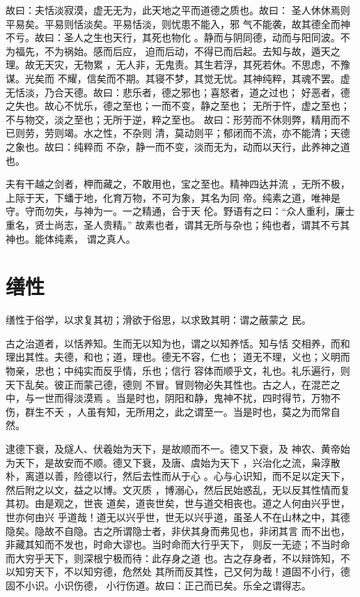 \documentclass[12pt,UTF8]{ctexbook}
\begin{document}
故曰：夫恬淡寂漠，虚无无为，此天地之平而道德之质也。故曰： 圣人休休焉则平易矣。平易则恬淡矣。平易恬淡，则忧患不能入，邪 气不能袭，故其德全而神不亏。故曰：圣人之生也天行，其死也物化 。静而与阴同德，动而与阳同波。不为福先，不为祸始。感而后应， 迫而后动，不得已而后起。去知与故，遁天之理。故无天灾，无物累 ，无人非，无鬼责。其生若浮，其死若休。不思虑，不豫谋。光矣而 不耀，信矣而不期。其寝不梦，其觉无忧。其神纯粹，其魂不罢。虚 无恬淡，乃合天德。故曰：悲乐者，德之邪也；喜怒者，道之过也； 好恶者，德之失也。故心不忧乐，德之至也；一而不变，静之至也； 无所于忤，虚之至也；不与物交，淡之至也；无所于逆，粹之至也。 故曰：形劳而不休则弊，精用而不已则劳，劳则竭。水之性，不杂则 清，莫动则平；郁闭而不流，亦不能清；天德之象也。故曰：纯粹而 不杂，静一而不变，淡而无为，动而以天行，此养神之道也。

夫有干越之剑者，柙而藏之，不敢用也，宝之至也。精神四达并流 ，无所不极，上际于天，下蟠于地，化育万物，不可为象，其名为同 帝。纯素之道，唯神是守。守而勿失，与神为一。一之精通，合于天 伦。野语有之曰：“众人重利，廉士重名，贤士尚志，圣人贵精。” 故素也者，谓其无所与杂也；纯也者，谓其不亏其神也。能体纯素， 谓之真人。
\section{缮性}

缮性于俗学，以求复其初；滑欲于俗思，以求致其明：谓之蔽蒙之 民。

古之治道者，以恬养知。生而无以知为也，谓之以知养恬。知与恬 交相养，而和理出其性。夫德，和也；道，理也。德无不容，仁也； 道无不理，义也；义明而物亲，忠也；中纯实而反乎情，乐也；信行 容体而顺乎文，礼也。礼乐遍行，则天下乱矣。彼正而蒙己德，德则 不冒。冒则物必失其性也。古之人，在混芒之中，与一世而得淡漠焉 。当是时也，阴阳和静，鬼神不扰，四时得节，万物不伤，群生不夭 ，人虽有知，无所用之，此之谓至一。当是时也，莫之为而常自然。

逮德下衰，及燧人、伏羲始为天下，是故顺而不一。德又下衰，及 神农、黄帝始为天下，是故安而不顺。德又下衰，及唐、虞始为天下 ，兴治化之流，枭淳散朴，离道以善，险德以行，然后去性而从于心 。心与心识知，而不足以定天下，然后附之以文，益之以博。文灭质 ，博溺心，然后民始惑乱，无以反其性情而复其初。由是观之，世丧 道矣，道丧世矣，世与道交相丧也。道之人何由兴乎世，世亦何由兴 乎道哉！道无以兴乎世，世无以兴乎道，虽圣人不在山林之中，其德 隐矣。隐故不自隐。古之所谓隐士者，非伏其身而弗见也，非闭其言 而不出也，非藏其知而不发也，时命大谬也。当时命而大行乎天下， 则反一无迹；不当时命而大穷乎天下，则深根宁极而待：此存身之道 也。古之存身者，不以辩饰知，不以知穷天下，不以知穷德，危然处 其所而反其性，己又何为哉！道固不小行，德固不小识。小识伤德， 小行伤道。故曰：正己而已矣。乐全之谓得志。
\end{document}
